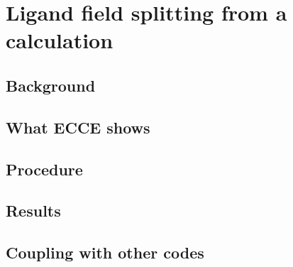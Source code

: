 \chapter{Ligand field splitting from a calculation}
\label{ch:ligand-field}


\section{Background}

\section{What ECCE shows}

\section{Procedure}

\section{Results}

\section{Coupling with other codes}

